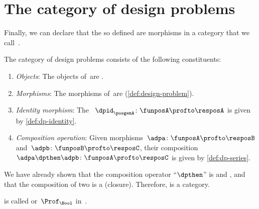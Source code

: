 
\section{The category of  design problems \DP}

Finally, we can declare that the  so defined are morphisms in a category that we call~\DP.


\begin{definition}
    \label{def:DP}
    The category of design problems \DP consists of the following constituents:
    \begin{enumerate}
        \item \emph{Objects}: The objects of~\DP are .
        \item \emph{Morphisms}: The morphisms of~\DP are  (\cref{def:design-problem}).
        \item \emph{Identity morphism}: The ~$\dpid_\posgenA \colon \funposA \profto \resposA$ is given by \cref{def:dp-identity}.
        \item \emph{Composition operation}: Given morphisms~$\adpa \colon  \funposA \profto \resposB$ and~$\adpb \colon \funposB \profto \resposC$, their composition~$\adpa \dpthen \adpb\colon \funposA\profto \resposC$ is given by \cref{def:dp-series}.
    \end{enumerate}
\end{definition}

We have already shown that the composition operator ``$\dpthen$'' is  and , and that the composition of two  is a  (closure).
Therefore, \DP is a category.

\DP is called \feas or~$\Prof_{\Bool}$ in~\cite{fong2019}.


